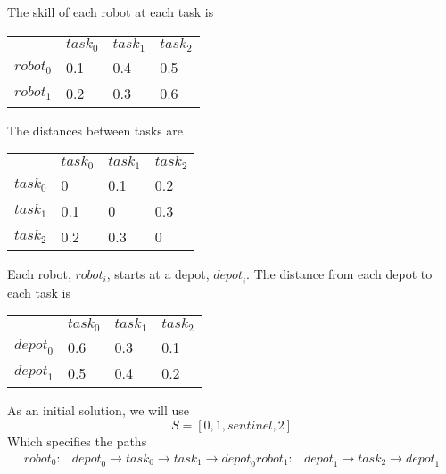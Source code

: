 \documentclass[a4paper]{article}
\begin{document}
The skill of each robot  at each task is

\begin{tabular}{llll}
                   & $\mathit{task}_0$ & $\mathit{task}_1$ & $\mathit{task}_2$ \\
$\mathit{robot}_0$ & 0.1               & 0.4               & 0.5               \\
$\mathit{robot}_1$ & 0.2               & 0.3               & 0.6               \\
\end{tabular}
\vspace{1.5em}

The distances between tasks are

\begin{tabular}{llll}
                   & $\mathit{task}_0$ & $\mathit{task}_1$ & $\mathit{task}_2$ \\
$\mathit{task}_0$  & 0                 & 0.1               & 0.2               \\
$\mathit{task}_1$  & 0.1               & 0                 & 0.3               \\
$\mathit{task}_2$  & 0.2               & 0.3               & 0                 \\
\end{tabular}
\vspace{1.5em}

Each robot, $\mathit{robot}_i$, starts at a depot, $\mathit{depot}_i$. The
distance from each depot to each task is

\begin{tabular}{llll}
                   & $\mathit{task}_0$ & $\mathit{task}_1$ & $\mathit{task}_2$ \\
$\mathit{depot}_0$ & 0.6               & 0.3               & 0.1               \\
$\mathit{depot}_1$ & 0.5               & 0.4               & 0.2               \\
\end{tabular}
\vspace{1.5em}

As an initial solution, we will use
$$S = [0, 1, \mathit{sentinel}, 2 ]$$
Which specifies the paths
\begin{align*}
\mathit{robot}_0: & \mathit{depot}_0 \rightarrow \mathit{task}_0 \rightarrow \mathit{task}_1 \rightarrow  \mathit{depot}_0
\mathit{robot}_1: & \mathit{depot}_1 \rightarrow \mathit{task}_2 \rightarrow \mathit{depot}_1
\end{align*}
\end{document}

